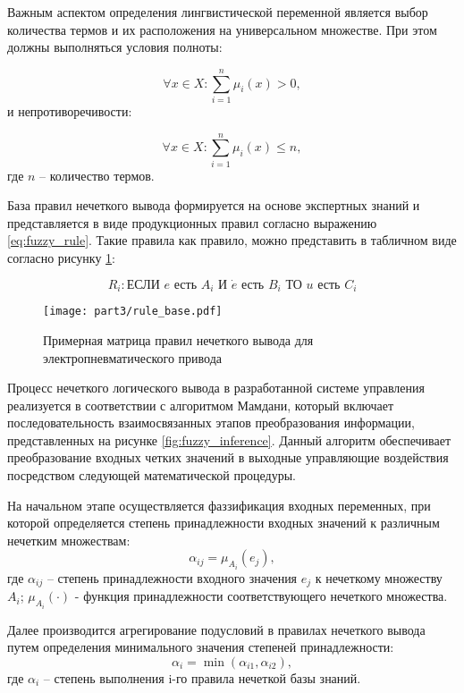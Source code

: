 Важным аспектом определения лингвистической переменной является выбор
количества термов и их расположения
на универсальном множестве. При этом должны выполняться условия полноты:

\begin{equation}
	\forall x \in X: \sum_{i=1}^n \mu_i(x) > 0,
\end{equation}
и непротиворечивости:

\begin{equation}
	\forall x \in X: \sum_{i=1}^n \mu_i(x) \leq n,
\end{equation}
где $n$ -- количество термов.

База правил нечеткого вывода формируется на основе экспертных знаний
и представляется в виде продукционных правил согласно выражению \ref{eq:fuzzy_rule}. Такие правила как правило,
можно представить в табличном виде согласно рисунку \ref{fig:fuzzy_rules}:

\begin{equation}\label{eq:fuzzy_rule}
	R_i: \text{ЕСЛИ } e \text{ есть } A_i \text{ И } \dot{e} \text{ есть } B_i \text{ ТО } u \text{ есть } C_i
\end{equation}

\begin{figure}[ht]
	\centering
	\texttt{[image: part3/rule\_base.pdf]}
	\caption{Примерная матрица правил нечеткого вывода для электропневматического привода}
	\label{fig:fuzzy_rules}
\end{figure}

Процесс нечеткого логического вывода в разработанной системе управления реализуется в
соответствии с алгоритмом Мамдани, который включает последовательность
взаимосвязанных этапов преобразования информации, представленных на рисунке \ref{fig:fuzzy_inference}. Данный алгоритм
обеспечивает преобразование входных четких значений в выходные управляющие воздействия посредством
следующей математической процедуры.

На начальном этапе осуществляется фаззификация входных переменных, при которой определяется
степень принадлежности входных значений к различным нечетким множествам:
\begin{equation}
	\alpha_{ij} = \mu_{A_i}(e_j),
\end{equation}
где $\alpha_{ij}$ -- степень принадлежности входного значения $e_j$ к нечеткому множеству $A_i$;
$\mu_{A_i}(\cdot)$ - функция принадлежности соответствующего нечеткого множества.

Далее производится агрегирование подусловий в правилах нечеткого вывода путем
определения минимального значения степеней принадлежности:
\begin{equation}
	\alpha_i = \min(\alpha_{i1}, \alpha_{i2}),
\end{equation}
где $\alpha_i$ -- степень выполнения i-го правила нечеткой базы знаний.

